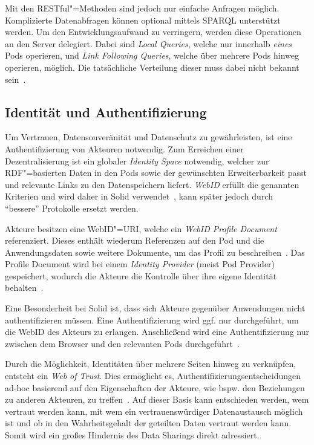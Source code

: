 Mit den RESTful"=Methoden sind jedoch nur einfache Anfragen möglich.
Komplizierte Datenabfragen können optional mittels SPARQL unterstützt werden.
Um den Entwicklungsaufwand zu verringern, werden diese Operationen an den Server delegiert.
Dabei sind \emph{Local Queries}, welche nur innerhalb \emph{eines} Pods operieren, und \emph{Link Following Queries}, welche über mehrere Pods hinweg operieren, möglich.
Die tatsächliche Verteilung dieser muss dabei nicht bekannt sein~\cite{sambraSolidPlatformDecentralized2016}.


\subsection{Identität und Authentifizierung}

Um Vertrauen, Datensouveränität und Datenschutz zu gewährleisten, ist eine Authentifizierung von Akteuren notwendig.
Zum Erreichen einer Dezentralisierung ist ein globaler \emph{Identity Space} notwendig, welcher zur RDF"=basierten Daten in den Pods sowie der gewünschten Erweiterbarkeit passt und relevante Links zu den Datenspeichern liefert.
\emph{WebID} erfüllt die genannten Kriterien und wird daher in Solid verwendet~\cite{sambraSolidPlatformDecentralized2016}, kann später jedoch durch \enquote{bessere} Protokolle ersetzt werden.

Akteure besitzen eine WebID"=URI, welche ein \emph{WebID Profile Document} referenziert.
Dieses enthält wiederum Referenzen auf den Pod und die Anwendungsdaten sowie weitere Dokumente, um das Profil zu beschreiben~\cite{solidcommunitygroupSolidWebIDProfile2024}.
Das Profile Document wird bei einem \emph{Identity Provider} (meist Pod Provider) gespeichert, wodurch die Akteure die Kontrolle über ihre eigene Identität behalten~\cite{sambraSolidPlatformDecentralized2016}.

Eine Besonderheit bei Solid ist, dass sich Akteure gegenüber Anwendungen nicht authentifizieren müssen.
Eine Authentifizierung wird ggf. nur durchgeführt, um die WebID des Akteurs zu erlangen.
Anschließend wird eine Authentifizierung nur zwischen dem Browser und den relevanten Pods durchgeführt~\cite{sambraSolidPlatformDecentralized2016}.

Durch die Möglichkeit, Identitäten über mehrere Seiten hinweg zu verknüpfen, entsteht ein \emph{Web of Trust}.
Dies ermöglicht es, Authentifizierungsentscheidungen ad-hoc basierend auf den Eigenschaften der Akteure, wie bspw. den Beziehungen zu anderen Akteuren, zu treffen~\cite{sambraSolidPlatformDecentralized2016}.
Auf dieser Basis kann entschieden werden, wem vertraut werden kann, mit wem ein vertrauenswürdiger Datenaustausch möglich ist und ob in den Wahrheitsgehalt der geteilten Daten vertraut werden kann.
Somit wird ein großes Hindernis des Data Sharings direkt adressiert.


